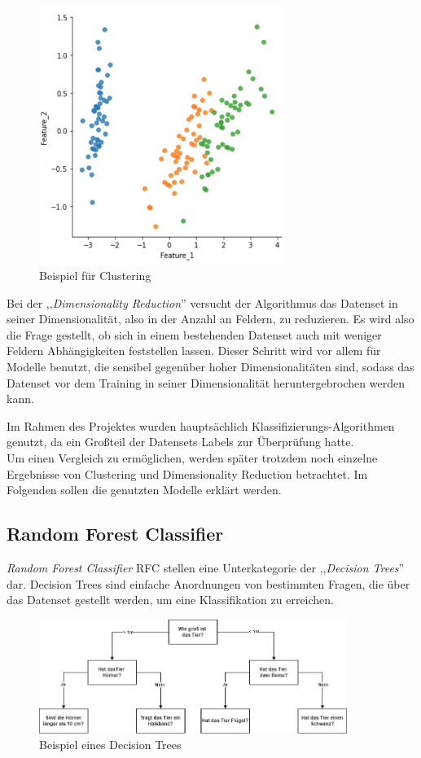 \begin{figure}[h]
    \centering
    \includegraphics[width=8.0cm]{./pic/Clustering_Beispiel.png}
    \caption{Beispiel für Clustering}
    \label{fig:Clustering_Beispiel}
\end{figure}

Bei der ,,\textit{Dimensionality Reduction}'' versucht der Algorithmus das Datenset in seiner 
Dimensionalität, also in der Anzahl an Feldern, zu reduzieren. Es wird also die Frage gestellt, 
ob sich in einem bestehenden Datenset auch mit weniger Feldern Abhängigkeiten feststellen lassen. Dieser 
Schritt wird vor allem für Modelle benutzt, die sensibel gegenüber hoher Dimensionalitäten sind, 
sodass das Datenset vor dem Training in seiner Dimensionalität heruntergebrochen werden kann.

Im Rahmen des Projektes wurden hauptsächlich Klassifizierungs-Algorithmen genutzt, da ein Großteil der 
Datensets Labels zur Überprüfung hatte.\\
Um einen Vergleich zu ermöglichen, werden später trotzdem noch 
einzelne Ergebnisse von Clustering und Dimensionality Reduction betrachtet. Im Folgenden sollen die genutzten 
Modelle erklärt werden.
\newpage
\subsection{Random Forest Classifier}

\textit{Random Forest Classifier} RFC stellen eine Unterkategorie der ,,\textit{Decision Trees}'' dar. Decision Trees sind einfache
Anordnungen von bestimmten Fragen, die über das Datenset gestellt werden, um eine Klassifikation zu erreichen.

\begin{figure}[h]
    \centering
    \includegraphics[width=10.0cm]{pic/DecisionTree.png}
    \caption{Beispiel eines Decision Trees}
    \label{fig:DT_Beispiel}
\end{figure}

